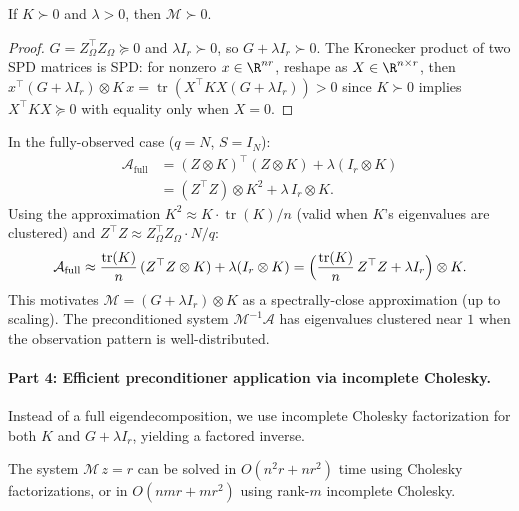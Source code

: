 \begin{theorem}\label{thm:p10-Mspd}
If $K \succ 0$ and $\lambda > 0$, then $\mathcal{M} \succ 0$.
\end{theorem}

\begin{proof}
$G = Z_\Omega^\top Z_\Omega \succeq 0$ and $\lambda I_r \succ 0$, so
$G + \lambda I_r \succ 0$. The Kronecker product of two SPD matrices is SPD:
for nonzero $x \in \R^{nr}$, reshape as $X \in \R^{n \times r}$, then
$x^\top(G + \lambda I_r)\otimes K\,x = \operatorname{tr}(X^\top K X (G + \lambda I_r)) > 0$
since $K \succ 0$ implies $X^\top KX \succeq 0$ with equality only when $X = 0$.
\end{proof}

\begin{lemma}\label{lem:p10-motivation}
In the fully-observed case ($q = N$, $S = I_N$):
\begin{align*}
  \mathcal{A}_{\text{full}}
  &= (Z \otimes K)^\top(Z \otimes K) + \lambda(I_r \otimes K)\\
  &= (Z^\top Z) \otimes K^2 + \lambda\,I_r \otimes K.
\end{align*}
Using the approximation $K^2 \approx K\cdot\operatorname{tr}(K)/n$ (valid when
$K$'s eigenvalues are clustered) and $Z^\top Z \approx Z_\Omega^\top Z_\Omega \cdot N/q$:
\[
  \mathcal{A}_{\text{full}} \approx \frac{\operatorname{tr}(K)}{n}\,(Z^\top Z \otimes K) + \lambda(I_r \otimes K)
  = \Bigl(\frac{\operatorname{tr}(K)}{n}\,Z^\top Z + \lambda I_r\Bigr)\otimes K.
\]
This motivates $\mathcal{M} = (G + \lambda I_r)\otimes K$ as a spectrally-close
approximation (up to scaling). The preconditioned system
$\mathcal{M}^{-1}\mathcal{A}$ has eigenvalues clustered near $1$ when
the observation pattern is well-distributed.
\end{lemma}

\paragraph{Part 4: Efficient preconditioner application via incomplete Cholesky.}

Instead of a full eigendecomposition, we use incomplete Cholesky factorization
for both $K$ and $G + \lambda I_r$, yielding a factored inverse.

\begin{theorem}\label{thm:p10-precsolve}
The system $\mathcal{M}\,z = r$ can be solved in $O(n^2 r + nr^2)$ time
using Cholesky factorizations, or in $O(nmr + mr^2)$ using rank-$m$
incomplete Cholesky.
\end{theorem}

